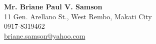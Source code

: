 %
%
%                 
\label{sec:appendixpersonalvitae}

%
%
%
%

%
%
\newcommand{\cv}[4]{\textbf{#1} \\ #2 \\ #3 \\ \url{#4}\vspace{0.5em}\\}

\cv{Mr. Briane Paul V. Samson}{11 Gen. Arellano St., West Rembo, Makati City}{0917-8319462}{briane.samson@yahoo.com}

